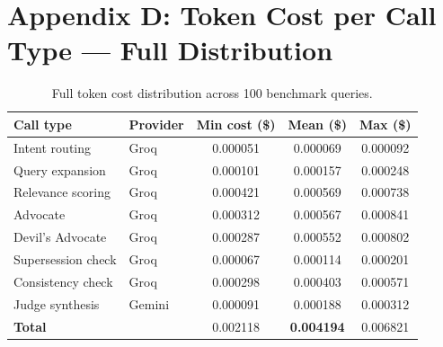 \documentclass[12pt,a4paper]{article}
\begin{document}
\section{Appendix D: Token Cost per Call Type — Full Distribution}

\begin{table}[H]
\centering
\caption{Full token cost distribution across 100 benchmark queries.}
\begin{tabular}{llccc}
\toprule
\textbf{Call type} & \textbf{Provider} & \textbf{Min cost (\$)} & \textbf{Mean (\$)} & \textbf{Max (\$)} \\
\midrule
Intent routing      & Groq   & 0.000051 & 0.000069 & 0.000092 \\
Query expansion     & Groq   & 0.000101 & 0.000157 & 0.000248 \\
Relevance scoring   & Groq   & 0.000421 & 0.000569 & 0.000738 \\
Advocate            & Groq   & 0.000312 & 0.000567 & 0.000841 \\
Devil's Advocate    & Groq   & 0.000287 & 0.000552 & 0.000802 \\
Supersession check  & Groq   & 0.000067 & 0.000114 & 0.000201 \\
Consistency check   & Groq   & 0.000298 & 0.000403 & 0.000571 \\
Judge synthesis     & Gemini & 0.000091 & 0.000188 & 0.000312 \\
\midrule
\textbf{Total}      &        & 0.002118 & \textbf{0.004194} & 0.006821 \\
\bottomrule
\end{tabular}
\end{table}
\end{document}
